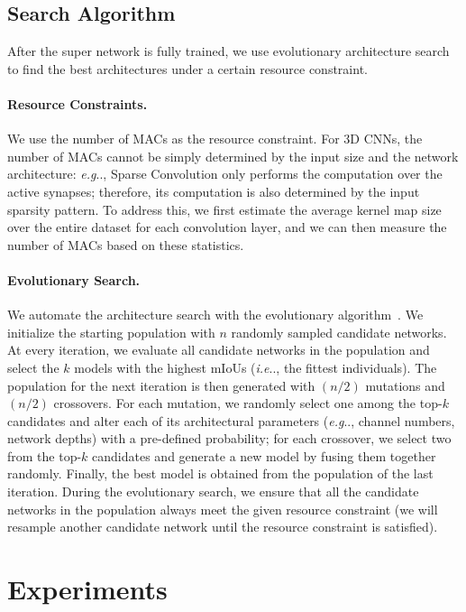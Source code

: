 \documentclass[runningheads]{llncs}
\makeatletter
\DeclareRobustCommand\onedot{\futurelet\@let@token\@onedot}
\def\@onedot{\ifx\@let@token.\else.\null\fi\xspace}
\def\eg{\emph{e.g}\onedot} \def\Eg{\emph{E.g}\onedot}
\def\ie{\emph{i.e}\onedot} \def\Ie{\emph{I.e}\onedot}
\makeatother
\begin{document}
\subsection{Search Algorithm}

After the super network is fully trained, we use evolutionary architecture search to find the best architectures under a certain resource constraint.

\paragraph{Resource Constraints.}

We use the number of MACs as the resource constraint. For 3D CNNs, the number of MACs cannot be simply determined by the input size and the network architecture: \eg, Sparse Convolution only performs the computation over the active synapses; therefore, its computation is also determined by the input sparsity pattern. To address this, we first estimate the average kernel map size over the entire dataset for each convolution layer, and we can then measure the number of MACs based on these statistics.

\paragraph{Evolutionary Search.}

We automate the architecture search with the evolutionary algorithm~\cite{guo2019single}. We initialize the starting population with $n$ randomly sampled candidate networks. At every iteration, we evaluate all candidate networks in the population and select the $k$ models with the highest mIoUs (\ie, the fittest individuals). The population for the next iteration is then generated with $(n/2)$ mutations and $(n/2)$ crossovers. For each mutation, we randomly select one among the top-$k$ candidates and alter each of its architectural parameters (\eg, channel numbers, network depths) with a pre-defined probability; for each crossover, we select two from the top-$k$ candidates and generate a new model by fusing them together randomly. Finally, the best model is obtained from the population of the last iteration. During the evolutionary search, we ensure that all the candidate networks in the population always meet the given resource constraint (we will resample another candidate network until the resource constraint is satisfied). \section{Experiments}
\end{document}
